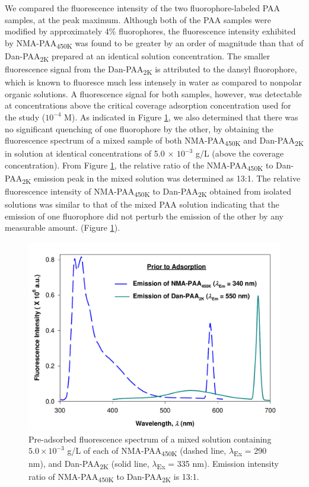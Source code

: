 \documentclass[journal=mamobx,manuscript=article]{achemso}
\begin{document}
We compared the fluorescence intensity of the two fluorophore-labeled PAA samples, at the peak maximum.  Although both of the PAA samples were modified by approximately 4\% fluorophores, the fluorescence intensity exhibited by NMA-PAA\textsubscript{450K} was found to be greater by an order of magnitude than that of Dan-PAA\textsubscript{2K} prepared at an identical solution concentration.  The smaller fluorescence signal from the Dan-PAA\textsubscript{2K} is attributed to the dansyl fluorophore, which is known to fluoresce much less intensely in water as compared to nonpolar organic solutions.\cite{weber1954fluorescent,Bednar1985,Chen1983}  A fluorescence signal for both samples, however, was detectable at concentrations above the critical coverage adsorption concentration used for the study ($10^{-4}$ M).  As indicated in Figure \ref{figure 3}, we also determined that there was no significant quenching of one fluorophore by the other, by obtaining the fluorescence spectrum of a mixed sample of both NMA-PAA\textsubscript{450K} and Dan-PAA\textsubscript{2K} in solution at identical concentrations of 5.0 $\times$ $10^{-3}$ g/L (above the coverage concentration).  From Figure \ref{figure 3}, the relative ratio of the NMA-PAA\textsubscript{450K} to Dan-PAA\textsubscript{2K} emission peak in the mixed solution was determined as 13:1.  The relative fluorescence intensity of NMA-PAA\textsubscript{450K} to Dan-PAA\textsubscript{2K} obtained from isolated solutions was similar to that of the mixed PAA solution indicating that the emission of one fluorophore did not perturb the emission of the other by any measurable amount. (Figure \ref{figure 3}).

\begin{figure}[H]
\includegraphics[scale=0.45]{Figure3_.pdf}
\caption{Pre-adsorbed fluorescence spectrum of a mixed solution containing $5.0 \times 10^{-3}$ g/L of each of NMA-PAA\textsubscript{450K} (dashed line, $\lambda$\textsubscript{Ex} = 290 nm), and Dan-PAA\textsubscript{2K} (solid line, $\lambda$\textsubscript{Ex} = 335 nm).  Emission intensity ratio of NMA-PAA\textsubscript{450K} to Dan-PAA\textsubscript{2K}  is 13:1.}
\label{figure 3}
\end{figure}
\end{document}

